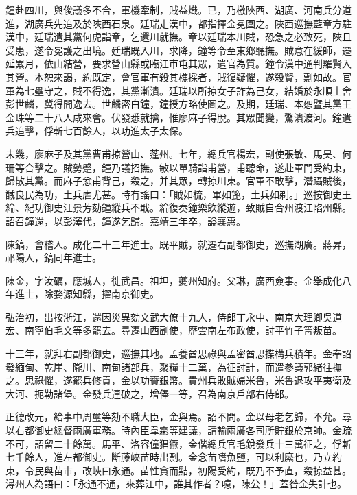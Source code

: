 \begin{pinyinscope}
鐘赴四川，與俊議多不合，軍機牽制，賊益熾。已，乃檄陜西、湖廣、河南兵分道進，湖廣兵先追及於陜西石泉。廷瑞走漢中，都指揮金冕圍之。陜西巡撫藍章方駐漢中，廷瑞遣其黨何虎詣章，乞還川就撫。章以廷瑞本川賊，恐急之必致死，陜且受患，遂令冕護之出境。廷瑞既入川，求降，鐘等令至東鄉聽撫。賊意在緩師，遷延累月，依山結營，要求營山縣或臨江市屯其眾，遣官為質。鐘令漢中通判羅賢入其營。本恕來謁，約既定，會官軍有殺其樵採者，賊復疑懼，遂殺賢，剽如故。官軍為七壘守之，賊不得逸，其黨漸潰。廷瑞以所掠女子詐為己女，結婚於永順土舍彭世麟，冀得間逸去。世麟密白鐘，鐘授方略使圖之。及期，廷瑞、本恕暨其黨王金珠等二十八人咸來會。伏發悉就擒，惟廖麻子得脫。其眾聞變，驚潰渡河。鐘遣兵追擊，俘斬七百餘人，以功進太子太保。

未幾，廖麻子及其黨曹甫掠營山、蓬州。七年，總兵官楊宏，副使張敏、馬昊、何珊等合擊之。賊勢蹙，鐘乃議招撫。敏以單騎詣甫營，甫聽命，遂赴軍門受約束，歸散其黨。而麻子忿甫背己，殺之，并其眾，轉掠川東。官軍不敢擊，潛躡賊後，馘良民為功，土兵虐尤甚。時有謠曰：「賊如梳，軍如篦，土兵如剃。」巡按御史王綸、紀功御史汪景芳劾鐘縱兵不戢。綸復奏鐘樂飲縱遊，致賊自合州渡江陷州縣。詔召鐘還，以彭澤代，鐘遂乞歸。嘉靖三年卒，謚襄惠。

陳鎬，會稽人。成化二十三年進士。既平賊，就遷右副都御史，巡撫湖廣。蔣昇，祁陽人，鎬同年進士。

陳金，字汝礪，應城人，徙武昌。祖坦，夔州知府。父琳，廣西僉事。金舉成化八年進士，除婺源知縣，擢南京御史。

弘治初，出按浙江，還因災異劾文武大僚十九人，侍郎丁永中、南京大理卿吳道宏、南寧伯毛文等多罷去。尋遷山西副使，歷雲南左布政使，討平竹子箐叛苗。

十三年，就拜右副都御史，巡撫其地。孟養酋思祿與孟密酋思揲構兵積年。金奉詔發緬甸、乾崖、隴川、南甸諸部兵，聚糧十二萬，為征討計，而遣參議郭緒往撫之。思祿懼，遂罷兵修貢，金以功賚銀幣。貴州兵敗賊婦米魯，米魯退攻平夷衛及大河、扼勒諸堡。金發兵連破之，增俸一等，召為南京戶部右侍郎。

正德改元，給事中周璽等劾不職大臣，金與焉。詔不問。金以母老乞歸，不允。尋以右都御史總督兩廣軍務。時內臣韋霦等建議，請輸兩廣各司所貯銀於京師。金疏不可，詔留二十餘萬。馬平、洛容僮猖獗，金偕總兵官毛銳發兵十三萬征之，俘斬七千餘人，進左都御史。斷藤峽苗時出剽。金念苗嗜魚鹽，可以利縻也，乃立約束，令民與苗市，改峽曰永通。苗性貪而黠，初陽受約，既乃不予直，殺掠益甚。潯州人為語曰：「永通不通，來葬江中，誰其作者？噫，陳公！」蓋咎金失計也。


\end{pinyinscope}
